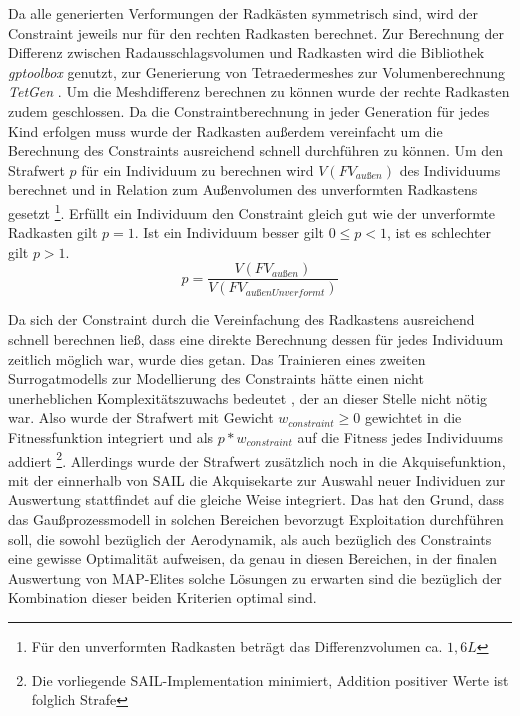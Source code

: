 Da alle generierten Verformungen der Radkästen symmetrisch sind, wird der Constraint jeweils nur für den rechten Radkasten berechnet.
Zur Berechnung der Differenz zwischen Radausschlagsvolumen und Radkasten wird die Bibliothek \textit{gptoolbox} \cite{gptoolbox.b} genutzt, zur Generierung von Tetraedermeshes zur Volumenberechnung \textit{TetGen} \cite{Si.2015}.
Um die Meshdifferenz berechnen zu können wurde der rechte Radkasten zudem geschlossen.
Da die Constraintberechnung in jeder Generation für jedes Kind erfolgen muss wurde der Radkasten außerdem vereinfacht um die Berechnung  des Constraints ausreichend schnell durchführen zu können.
Um den Strafwert $p$ für ein Individuum zu berechnen wird $V(FV_{außen})$ des Individuums berechnet und in Relation zum Außenvolumen des unverformten Radkastens gesetzt \footnote{Für den unverformten Radkasten beträgt das Differenzvolumen ca. $1,6L$}.
Erfüllt ein Individuum den Constraint gleich gut wie der unverformte Radkasten gilt $p=1$.
Ist ein Individuum besser gilt $0\leq p < 1$, ist es schlechter gilt $p>1$.
\[
	p = \frac{V(FV_{außen})}{V(FV_{außenUnverformt})}
\]

Da sich der Constraint durch die Vereinfachung des Radkastens ausreichend schnell berechnen ließ, dass eine direkte Berechnung dessen für jedes Individuum zeitlich möglich war, wurde dies getan.
Das Trainieren eines zweiten Surrogatmodells zur Modellierung des Constraints hätte einen nicht unerheblichen Komplexitätszuwachs bedeutet , der an dieser Stelle nicht nötig war.
Also wurde der Strafwert mit Gewicht $w_{constraint} \geq 0$ gewichtet in die Fitnessfunktion integriert und als $p*w_{constraint}$ auf die Fitness jedes Individuums addiert
\footnote{Die vorliegende SAIL-Implementation minimiert, Addition positiver Werte ist folglich Strafe}.
Allerdings wurde der Strafwert zusätzlich noch in die Akquisefunktion, mit der einnerhalb von SAIL die Akquisekarte zur Auswahl neuer Individuen zur Auswertung stattfindet auf die gleiche Weise integriert. Das hat den Grund, dass das Gaußprozessmodell in solchen Bereichen bevorzugt Exploitation durchführen soll, die sowohl bezüglich der Aerodynamik, als auch bezüglich des Constraints eine gewisse Optimalität aufweisen, da genau in diesen Bereichen, in der finalen Auswertung von MAP-Elites solche Lösungen zu erwarten sind die bezüglich der Kombination dieser beiden Kriterien optimal sind.


